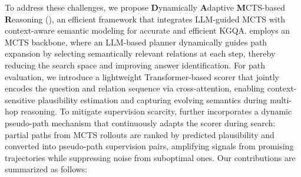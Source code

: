 To address these challenges, we propose \textbf{D}ynamically \textbf{A}daptive \textbf{M}CTS-based \textbf{R}easoning (\method{}), an efficient framework that integrates LLM-guided MCTS with context-aware semantic modeling for accurate and efficient KGQA.
\method{} employs an MCTS backbone, where an LLM-based planner dynamically guides path expansion by selecting semantically relevant relations at each step, thereby reducing the search space and improving answer identification.
For path evaluation, we introduce a lightweight Transformer-based scorer that jointly encodes the question and relation sequence via cross-attention, enabling context-sensitive plausibility estimation and capturing evolving semantics during multi-hop reasoning.
To mitigate supervision scarcity, \method{} further incorporates a dynamic pseudo-path mechanism that continuously adapts the scorer during search: partial paths from MCTS rollouts are ranked by predicted plausibility and converted into pseudo-path supervision pairs, amplifying signals from promising trajectories while suppressing noise from suboptimal ones.
Our contributions are summarized as follows:

